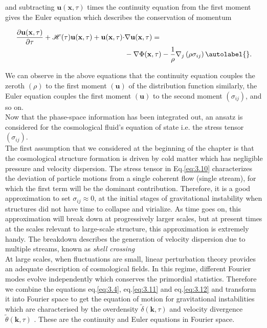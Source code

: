 and subtracting $\mathbf{u}(\mathbf{x}, \tau)$ times the continuity equation from the first moment gives the Euler equation which describes the conservation of momentum


\begin{align*}
    \frac{\partial \mathbf{u}(\mathbf{x}, \tau)}{\partial \tau}+\mathcal{H}(\tau) \mathbf{u}(\mathbf{x}, \tau)+\mathbf{u}(\mathbf{x}, \tau) \cdot & \nabla \mathbf{u}(\mathbf{x}, \tau)= \\
    & -\nabla \Phi(\mathbf{x}, \tau)-\frac{1}{\rho} \nabla_{j}\left(\rho \sigma_{i j}\right) \autolabel{}.
\end{align*}


We can observe in the above equations that the continuity equation couples the zeroth $(\rho)$ to the first moment $(\mathbf{u})$ of the distribution function similarly, the Euler equation couples the first moment $(\mathbf{u})$ to the second moment $\left(\sigma_{i j}\right)$, and so on.\\
Now that the phase-space information has been integrated out, an ansatz is considered for the cosmological fluid's equation of state i.e. the stress tensor $\left(\sigma_{i j}\right)$.\\

The first assumption that we considered at the beginning of the chapter is that the cosmological structure formation is driven by cold matter which has negligible pressure and velocity dispersion. The stress tensor in Eq.\eqref{eq:3.10} characterizes the deviation of particle motions from a single coherent flow (single stream), for which the first term will be the dominant contribution. Therefore, it is a good approximation to set $\sigma_{i j} \approx 0$, at the initial stages of gravitational instability when structures did not have time to collapse and virialize. As time goes on, this approximation will break down at progressively larger scales, but at present times at the scales relevant to large-scale structure, this approximation is extremely handy. The breakdown describes the generation of velocity dispersion due to multiple streams, known as \emph{shell crossing}\\

At large scales, when fluctuations are small, linear perturbation theory provides an adequate description of cosmological fields. In this regime, different Fourier modes evolve independently which conserves the primordial statistics. Therefore we combine the equations  eq.\eqref{eq:3.4}, eq.\eqref{eq:3.11} and eq.\eqref{eq:3.12}  and transform it into Fourier space to get the equation of motion for gravitational instabilities which are characterised by the overdensity $\tilde{\delta}(\mathbf{k}, \tau)$ and velocity divergence $\tilde{\theta}(\mathbf{k}, \tau)$ . These are the continuity and Euler equations in Fourier space.\\


